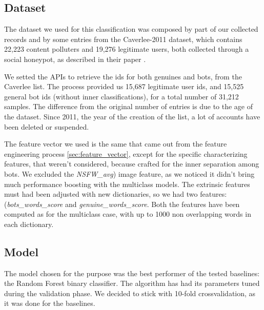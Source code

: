\subsection{Dataset}
The dataset we used for this classification was composed by part of our collected records and by some entries from the Caverlee-2011 dataset, which contains 22,223 content polluters and 19,276 legitimate users, both collected through a social honeypot, as described in their paper \cite{Lee11sevenmonths}.

We setted the APIs to retrieve the ids for both genuines and bots, from the Caverlee list. The process provided us 15,687 legitimate user ids, and 15,525 general bot ids (without inner classifications), for a total number of 31,212 samples.
The difference from the original number of entries is due to the age of the dataset. Since 2011, the year of the creation of the list, a lot of accounts have been deleted or suspended.

The feature vector we used is the same that came out from the feature engineering process \ref{sec:feature_vector}, except for the specific characterizing features, that weren't considered, because crafted for the inner separation among bots. We excluded the \textit{NSFW\_avg}) image feature, as we noticed it didn't bring much performance boosting with the multiclass models.
The extrinsic features must had been adjusted with new dictionaries, so we had two features: (\textit{bots\_words\_score} and  \textit{genuine\_words\_score}.
Both the features have been computed as for the multiclass case, with up to 1000 non overlapping words in each dictionary.

\subsection{Model}
The model chosen for the purpose was the best performer of the tested baselines: the Random Forest binary classifier.
The algorithm has had its parameters tuned during the validation phase.
We decided to stick with 10-fold crossvalidation, as it was done for the baselines.

